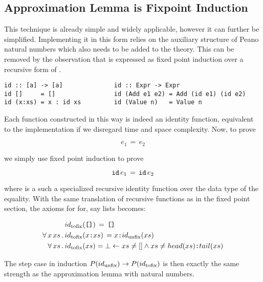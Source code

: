 \subsection{Approximation Lemma is Fixpoint Induction}

This technique is already simple and widely applicable, however it can
further be simplified. Implementing it in this form relies on the
auxiliary structure of Peano natural numbers which also needs to be
added to the theory. This can be removed by the observation that is
expressed as fixed point induction over a recursive form of .

\begin{verbatim}
id :: [a] -> [a]              id :: Expr -> Expr
id []     = []                id (Add e1 e2) = Add (id e1) (id e2)
id (x:xs) = x : id xs         id (Value n)   = Value n
\end{verbatim}

Each  function constructed in this way is indeed an identity
function, equivalent to the implementation  if we
disregard time and space complexity. Now, to prove

\begin{equation*}
e_1 \, = \, e_2
\end{equation*}

we simply use fixed point induction to prove

\begin{equation*}
\hs{id} \, e_1 \, = \, \hs{id} \, e_2
\end{equation*}

where  is a such a specialized recursive identity function over
the data type of the equality. With the same translation of recursive
functions as in the fixed point section, the axioms for  for, say
lists becomes:

\begin{align*}
            & \tofix{id}(\hs{[]}) \,   = \, \hs{[]}                                                           \\
\faa{x}{xs} & \tofix{id}(x\hs{:}xs) \, = x\hs{:}\unfix{id}(xs)                                                \\
\fa{xs}     & \tofix{id}(xs)           = \bot  \leftarrow    xs \neq [] \wedge xs \neq head(xs)\hs{:}tail(xs) \\
\end{align*}

The step case in induction $P(id_{\mathrm{unfix}}) \rightarrow P(id_{\mathrm{tofix}})$
is then exactly the same strength as the approximation lemma with
natural numbers.

